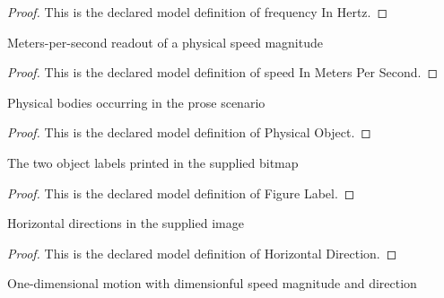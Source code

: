 \begin{proof}
  This is the declared model definition of frequency In Hertz.
\end{proof}
\begin{definition}
  \label{def:physics:phyx-mini-0214:phyxminiproblems-problemphyxmini0214-speedinmeterspersecond}
  Meters-per-second readout of a physical speed magnitude
\end{definition}
\begin{proof}
  This is the declared model definition of speed In Meters Per Second.
\end{proof}
\begin{definition}
  \label{def:physics:phyx-mini-0214:phyxminiproblems-problemphyxmini0214-physicalobject}
  Physical bodies occurring in the prose scenario
\end{definition}
\begin{proof}
  This is the declared model definition of Physical Object.
\end{proof}
\begin{definition}
  \label{def:physics:phyx-mini-0214:phyxminiproblems-problemphyxmini0214-figurelabel}
  The two object labels printed in the supplied bitmap
\end{definition}
\begin{proof}
  This is the declared model definition of Figure Label.
\end{proof}
\begin{definition}
  \label{def:physics:phyx-mini-0214:phyxminiproblems-problemphyxmini0214-horizontaldirection}
  Horizontal directions in the supplied image
\end{definition}
\begin{proof}
  This is the declared model definition of Horizontal Direction.
\end{proof}
\begin{definition}
  \label{def:physics:phyx-mini-0214:phyxminiproblems-problemphyxmini0214-horizontalmotion}
  One-dimensional motion with dimensionful speed magnitude and direction
\end{definition}

